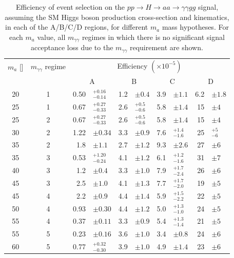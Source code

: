 \begin{table}[t]
  \begin{center}
    \caption{Efficiency of event selection on the $pp\to H\to aa \to \gamma\gamma gg$ signal, 
      assuming the SM Higgs boson production cross-section and kinematics,
      in each of the A/B/C/D regions, for different $m_a$ mass hypotheses.
      For each $m_a$ value, all $m_{\gamma\gamma}$ regimes in which there is no significant signal acceptance loss due to the $m_{\gamma\gamma}$ requirement are shown.
    }
    \label{tab:HBSM:ABCD}
    \footnotesize
    \bgroup
    \def\arraystretch{1.5}
    \begin{tabular}{
        c
        c
        r@{}l
        r@{}l
        r@{}l
        r@{}l
      }
      \hline
      {$m_a$ [\GeV{}]} & {$m_{\gamma\gamma}$ regime} & \multicolumn{8}{c}{Efficiency $(\times 10^{-5})$}  \\
      & & \multicolumn{2}{c}{A} & \multicolumn{2}{c}{B} & \multicolumn{2}{c}{C} & \multicolumn{2}{c}{D}  \\
      \hline
      20 & 1 & 0.50&$^{+0.16}_{-0.14}$ & 1.2&$\pm0.4$ & 3.9&$\pm1.1$           & 6.2&$\pm1.8$           \\
      25 & 1 & 0.67&$^{+0.27}_{-0.33}$ & 2.6&$^{+0.5}_{-0.6}$ & 5.8&$\pm1.4$           & 15&$\pm4$           \\ 
      25 & 2 & 0.67&$^{+0.27}_{-0.33}$ & 2.6&$^{+0.5}_{-0.6}$ & 5.8&$\pm1.4$           & 15&$\pm4$           \\ 
      30 & 2 & 1.22&$\pm0.34$           & 3.3&$\pm0.9$          & 7.6&$^{+1.4}_{-1.6}$   & 25&$^{+5}_{-6}$   \\
      35 & 2 & 1.8&$\pm1.1$            & 2.7&$\pm1.2$           & 9.3&$\pm2.6$           & 27&$\pm6$           \\ 
      35 & 3 & 0.53&$^{+1.20}_{-0.24}$  & 4.1&$\pm1.2$           & 6.1&$^{+1.2}_{-1.6}$   & 31&$\pm7$           \\
      40 & 3 &  1.2&$\pm0.4$           & 3.3&$\pm1.0$           & 7.9&$^{+1.7}_{-2.4}$   & 26&$\pm6$           \\
      45 & 3 & 2.5&$\pm1.0$           & 4.1&$\pm1.3$           & 7.7&$^{+1.7}_{-2.0}$   & 19&$\pm5$           \\ 
      45 & 4 & 2.2&$\pm0.9$  & 4.4&$\pm1.4$           & 5.9&$^{+1.5}_{-2.2}$   & 22&$\pm5$           \\ 
      50 & 4 &  0.93&$\pm0.30$           & 4.4&$\pm1.2$           & 5.0&$^{+1.3}_{-1.0}$   & 24&$\pm5$   \\
      55 & 4 & 0.37&$\pm0.11$          & 3.3&$\pm0.9$          & 5.4&$^{+1.3}_{-1.4}$   & 21&$\pm5$           \\ 
      55 & 5 & 0.23&$\pm0.16$          & 3.6&$\pm1.0$          & 3.4&$\pm0.8$          & 24&$\pm6$           \\ 
      60 & 5 &  0.77&$^{+0.32}_{-0.30}$  & 3.9&$\pm1.0$           & 4.9&$\pm1.4$           & 23&$\pm6$           \\
      \hline
    \end{tabular}
    \egroup
  \end{center}
\end{table}

